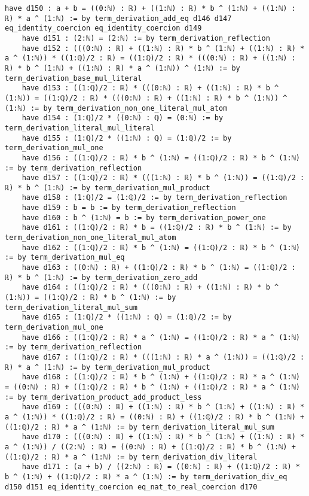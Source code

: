 \documentclass{article}
\begin{document}
\begin{tcolorbox}[colback=white!10, width=\linewidth]
\begin{lstlisting}[language=Lean4]
    have d150 : a + b = ((0:ℕ) : ℝ) + ((1:ℕ) : ℝ) * b ^ (1:ℕ) + ((1:ℕ) : ℝ) * a ^ (1:ℕ) := by term_derivation_add_eq d146 d147 eq_identity_coercion eq_identity_coercion d149
    have d151 : (2:ℕ) = (2:ℕ) := by term_derivation_reflection
    have d152 : (((0:ℕ) : ℝ) + ((1:ℕ) : ℝ) * b ^ (1:ℕ) + ((1:ℕ) : ℝ) * a ^ (1:ℕ)) * ((1:ℚ)/2 : ℝ) = ((1:ℚ)/2 : ℝ) * (((0:ℕ) : ℝ) + ((1:ℕ) : ℝ) * b ^ (1:ℕ) + ((1:ℕ) : ℝ) * a ^ (1:ℕ)) ^ (1:ℕ) := by term_derivation_base_mul_literal
    have d153 : ((1:ℚ)/2 : ℝ) * (((0:ℕ) : ℝ) + ((1:ℕ) : ℝ) * b ^ (1:ℕ)) = ((1:ℚ)/2 : ℝ) * (((0:ℕ) : ℝ) + ((1:ℕ) : ℝ) * b ^ (1:ℕ)) ^ (1:ℕ) := by term_derivation_non_one_literal_mul_atom
    have d154 : (1:ℚ)/2 * ((0:ℕ) : ℚ) = (0:ℕ) := by term_derivation_literal_mul_literal
    have d155 : (1:ℚ)/2 * ((1:ℕ) : ℚ) = (1:ℚ)/2 := by term_derivation_mul_one
    have d156 : ((1:ℚ)/2 : ℝ) * b ^ (1:ℕ) = ((1:ℚ)/2 : ℝ) * b ^ (1:ℕ) := by term_derivation_reflection
    have d157 : ((1:ℚ)/2 : ℝ) * (((1:ℕ) : ℝ) * b ^ (1:ℕ)) = ((1:ℚ)/2 : ℝ) * b ^ (1:ℕ) := by term_derivation_mul_product
    have d158 : (1:ℚ)/2 = (1:ℚ)/2 := by term_derivation_reflection
    have d159 : b = b := by term_derivation_reflection
    have d160 : b ^ (1:ℕ) = b := by term_derivation_power_one
    have d161 : ((1:ℚ)/2 : ℝ) * b = ((1:ℚ)/2 : ℝ) * b ^ (1:ℕ) := by term_derivation_non_one_literal_mul_atom
    have d162 : ((1:ℚ)/2 : ℝ) * b ^ (1:ℕ) = ((1:ℚ)/2 : ℝ) * b ^ (1:ℕ) := by term_derivation_mul_eq
    have d163 : ((0:ℕ) : ℝ) + ((1:ℚ)/2 : ℝ) * b ^ (1:ℕ) = ((1:ℚ)/2 : ℝ) * b ^ (1:ℕ) := by term_derivation_zero_add
    have d164 : ((1:ℚ)/2 : ℝ) * (((0:ℕ) : ℝ) + ((1:ℕ) : ℝ) * b ^ (1:ℕ)) = ((1:ℚ)/2 : ℝ) * b ^ (1:ℕ) := by term_derivation_literal_mul_sum
    have d165 : (1:ℚ)/2 * ((1:ℕ) : ℚ) = (1:ℚ)/2 := by term_derivation_mul_one
    have d166 : ((1:ℚ)/2 : ℝ) * a ^ (1:ℕ) = ((1:ℚ)/2 : ℝ) * a ^ (1:ℕ) := by term_derivation_reflection
    have d167 : ((1:ℚ)/2 : ℝ) * (((1:ℕ) : ℝ) * a ^ (1:ℕ)) = ((1:ℚ)/2 : ℝ) * a ^ (1:ℕ) := by term_derivation_mul_product
    have d168 : ((1:ℚ)/2 : ℝ) * b ^ (1:ℕ) + ((1:ℚ)/2 : ℝ) * a ^ (1:ℕ) = ((0:ℕ) : ℝ) + ((1:ℚ)/2 : ℝ) * b ^ (1:ℕ) + ((1:ℚ)/2 : ℝ) * a ^ (1:ℕ) := by term_derivation_product_add_product_less
    have d169 : (((0:ℕ) : ℝ) + ((1:ℕ) : ℝ) * b ^ (1:ℕ) + ((1:ℕ) : ℝ) * a ^ (1:ℕ)) * ((1:ℚ)/2 : ℝ) = ((0:ℕ) : ℝ) + ((1:ℚ)/2 : ℝ) * b ^ (1:ℕ) + ((1:ℚ)/2 : ℝ) * a ^ (1:ℕ) := by term_derivation_literal_mul_sum
    have d170 : (((0:ℕ) : ℝ) + ((1:ℕ) : ℝ) * b ^ (1:ℕ) + ((1:ℕ) : ℝ) * a ^ (1:ℕ)) / ((2:ℕ) : ℝ) = ((0:ℕ) : ℝ) + ((1:ℚ)/2 : ℝ) * b ^ (1:ℕ) + ((1:ℚ)/2 : ℝ) * a ^ (1:ℕ) := by term_derivation_div_literal
    have d171 : (a + b) / ((2:ℕ) : ℝ) = ((0:ℕ) : ℝ) + ((1:ℚ)/2 : ℝ) * b ^ (1:ℕ) + ((1:ℚ)/2 : ℝ) * a ^ (1:ℕ) := by term_derivation_div_eq d150 d151 eq_identity_coercion eq_nat_to_real_coercion d170

\end{lstlisting}
\end{tcolorbox}
\end{document}
